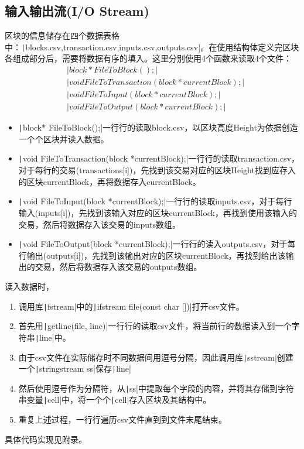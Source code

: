 \documentclass[10pt,a4paper]{article}
\begin{document}
    \subsection{输入输出流(I/O Stream)}
    区块的信息储存在四个数据表格中：\texttt|blocks.csv,transaction.csv,inputs.csv,outputs.csv|。在使用结构体定义完区块各组成部分后，需要将数据有序的填入。这里分别使用4个函数来读取4个文件：
    \begin{align*}
        &\texttt|block* FileToBlock();|\\
        &\texttt|void FileToTransaction(block *currentBlock);|\\ 
        &\texttt|void FileToInput(block *currentBlock);|\\
        &\texttt|void FileToOutput(block *currentBlock);|
    \end{align*}
    \begin{itemize}
        \item \texttt|block* FileToBlock();|一行行的读取block.csv，以区块高度Height为依据创造一个个区块并读入数据。
        \item \texttt|void FileToTransaction(block *currentBlock);|一行行的读取transaction.csv，对于每行的交易(transactions[i])，先找到该交易对应的区块Height找到应存入的区块currentBlock，再将数据存入currentBlock。
        \item \texttt|void FileToInput(block *currentBlock);|一行行的读取inputs.csv，对于每行输入(inputs[i])，先找到该输入对应的区块currentBlock，再找到使用该输入的交易，然后将数据存入该交易的inputs数组。
        \item \texttt|void FileToOutput(block *currentBlock);|一行行的读入outputs.csv，对于每行输出(outputs[i])，先找到该输出对应的区块currentBlock，再找到给出该输出的交易，然后将数据存入该交易的outputs数组。
    \end{itemize}
    读入数据时，
    \begin{enumerate}
        \item 调用库\texttt|fstream|中的\texttt|ifstream file(const char [])|打开csv文件。
        \item 首先用\texttt|getline(file, line)|一行行的读取csv文件，将当前行的数据读入到一个字符串\texttt|line|中。
        \item 由于csv文件在实际储存时不同数据间用逗号分隔，因此调用库\texttt|sstream|创建一个\texttt|stringstream ss|保存\texttt|line|
        \item 然后使用逗号作为分隔符，从\texttt|ss|中提取每个字段的内容，并将其存储到字符串变量\texttt|cell|中，将一个个\texttt|cell|存入区块及其结构中。
        \item 重复上述过程，一行行遍历csv文件直到到文件末尾结束。
    \end{enumerate}
    具体代码实现见附录。
\end{document}
